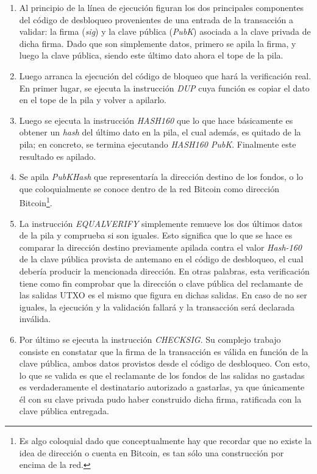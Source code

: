 \begin{enumerate}
  \item Al principio de la línea de ejecución figuran los dos principales componentes del código de desbloqueo provenientes de una entrada de la transacción a validar: la firma (\textit{sig}) y la clave pública (\textit{PubK}) asociada a la clave privada de dicha firma. Dado que son simplemente datos, primero se apila la firma, y luego la clave pública, siendo este último dato ahora el tope de la pila.
  \item Luego arranca la ejecución del código de bloqueo que hará la verificación real. En primer lugar, se ejecuta la instrucción \textit{DUP} cuya función es copiar el dato en el tope de la pila y volver a apilarlo.
  \item Luego se ejecuta la instrucción \textit{HASH160} que lo que hace básicamente es obtener un \textit{hash} del último dato en la pila, el cual además, es quitado de la pila; en concreto, se termina ejecutando \textit{HASH160 PubK}. Finalmente este resultado es apilado.
  \item Se apila \textit{PubKHash} que representaría la dirección destino de los fondos, o lo que coloquialmente se conoce dentro de la red Bitcoin como dirección Bitcoin\footnote{Es algo coloquial dado que conceptualmente hay que recordar que no existe la idea de dirección o cuenta en Bitcoin, es tan sólo una construcción por encima de la red.}.
  \item La instrucción \textit{EQUALVERIFY} simplemente remueve los dos últimos datos de la pila y comprueba si son iguales. Esto significa que lo que se hace es comparar la dirección destino previamente apilada contra el valor \textit{Hash-160} de la clave pública provista de antemano en el código de desbloqueo, el cual debería producir la mencionada dirección. En otras palabras, esta verificación tiene como fin comprobar que la dirección o clave pública del reclamante de las salidas UTXO es el mismo que figura en dichas salidas. En caso de no ser iguales, la ejecución y la validación fallará y la transacción será declarada inválida.
  \item Por último se ejecuta la instrucción \textit{CHECKSIG}. Su complejo trabajo consiste en constatar que la firma de la transacción es válida en función de la clave pública, ambos datos provistos desde el código de desbloqueo. Con esto, lo que se valida es que el reclamante de los fondos de las salidas no gastadas es verdaderamente el destinatario autorizado a gastarlas, ya que únicamente él con su clave privada pudo haber construido dicha firma, ratificada con la clave pública entregada.
\end{enumerate}

